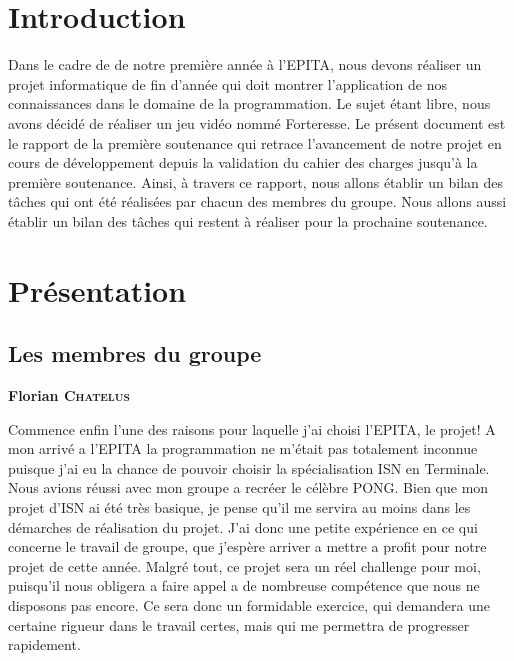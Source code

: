 \documentclass[a4paper, 12pt]{article}
\begin{document}
\begin{spacing}{1.0}
	\tableofcontents
\end{spacing}

\newpage
\section{Introduction}
Dans le cadre de de notre première année à l'EPITA, nous devons réaliser un projet informatique de fin d'année qui doit montrer l'application de nos connaissances dans le domaine de la programmation.
Le sujet étant libre, nous avons décidé de réaliser un jeu vidéo nommé Forteresse.
Le présent document est  le rapport de la première soutenance qui retrace l'avancement de notre projet en cours de développement depuis la validation du cahier des charges jusqu'à la première soutenance. Ainsi, à travers ce rapport, nous allons établir un bilan des tâches qui ont été réalisées par chacun des membres du groupe. Nous allons aussi établir un bilan  des tâches qui restent à  réaliser pour  la prochaine soutenance.

\newpage

\section{Présentation}
	\subsection{Les membres du groupe}
	\parindent=0cm\textbf{Florian \textsc{Chatelus}}
	\smallbreak
	\par \parindent=0.5cm Commence enfin l'une des raisons pour laquelle j'ai choisi l'EPITA, le projet! A mon arrivé a l'EPITA la programmation ne m'était pas totalement inconnue puisque j'ai eu la chance de pouvoir choisir la spécialisation ISN en Terminale. Nous avions réussi avec mon groupe a recréer le célèbre PONG. Bien que mon projet d'ISN ai été très basique, je pense qu'il me servira au moins dans les démarches de réalisation du projet. J'ai donc une petite expérience en ce qui concerne le travail de groupe, que j'espère arriver a mettre a profit pour notre projet de cette année. Malgré tout, ce projet sera un réel challenge pour moi, puisqu'il nous obligera a faire appel a de nombreuse compétence que nous ne disposons pas encore. Ce sera donc un formidable exercice, qui demandera une certaine rigueur dans le travail certes, mais qui me permettra de progresser rapidement.\\
	
\end{document}
